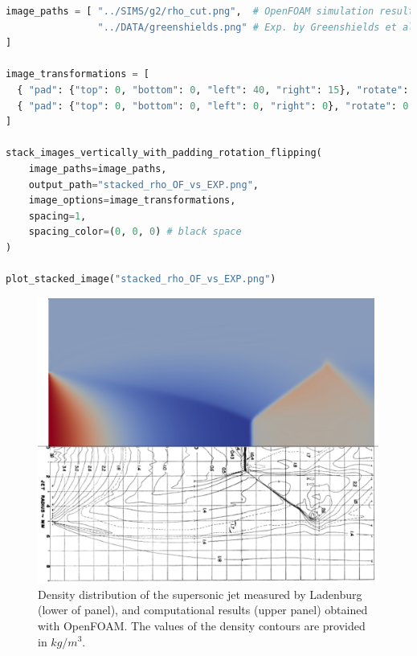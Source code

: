 \documentclass[12pt]{article}
\begin{document}
\begin{lstlisting}[language=Python, caption=Script to post-process results of OpenFOAM and experimental data., label=OF_vs_EXP_stack]
image_paths = [ "../SIMS/g2/rho_cut.png",  # OpenFOAM simulation results
                "../DATA/greenshields.png" # Exp. by Greenshields et al.
]

image_transformations = [
  { "pad": {"top": 0, "bottom": 0, "left": 40, "right": 15}, "rotate": 0 },
  { "pad": {"top": 0, "bottom": 0, "left": 0, "right": 0}, "rotate": 0 }
]

stack_images_vertically_with_padding_rotation_flipping(
    image_paths=image_paths,
    output_path="stacked_rho_OF_vs_EXP.png",
    image_options=image_transformations,
    spacing=1,
    spacing_color=(0, 0, 0) # black space
)

plot_stacked_image("stacked_rho_OF_vs_EXP.png")
\end{lstlisting}

\begin{figure}[H]
    \centering
    \includegraphics[width=0.95\linewidth]{figs/stacked_rho_OF_vs_EXP.png}
    \caption{Density distribution of the supersonic jet measured by Ladenburg~\cite{ladenburg1949interferometric} (lower of panel), and computational results (upper panel) obtained with OpenFOAM. The values of the density contours are provided in $kg/m^3$.}
    \label{fig:rho_OF_vs_EXP}
\end{figure}
\end{document}
